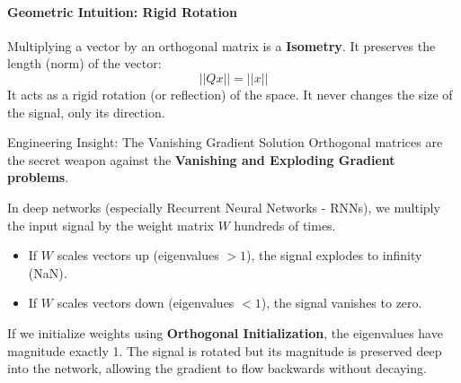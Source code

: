 \paragraph{Geometric Intuition: Rigid Rotation}
Multiplying a vector by an orthogonal matrix is a \textbf{Isometry}. It preserves the length (norm) of the vector:
\[ ||Qx|| = ||x|| \]
It acts as a rigid rotation (or reflection) of the space. It never changes the size of the signal, only its direction.

\begin{unibobox}{Engineering Insight: The Vanishing Gradient Solution}
Orthogonal matrices are the secret weapon against the \textbf{Vanishing and Exploding Gradient problems}.

In deep networks (especially Recurrent Neural Networks - RNNs), we multiply the input signal by the weight matrix $W$ hundreds of times.
\begin{itemize}
    \item If $W$ scales vectors up (eigenvalues $> 1$), the signal explodes to infinity (NaN).
    \item If $W$ scales vectors down (eigenvalues $< 1$), the signal vanishes to zero.
\end{itemize}

If we initialize weights using \textbf{Orthogonal Initialization}, the eigenvalues have magnitude exactly 1. The signal is rotated but its magnitude is preserved deep into the network, allowing the gradient to flow backwards without decaying.
\end{unibobox}
